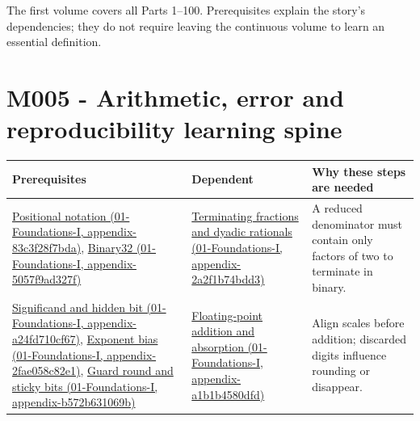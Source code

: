 The first volume covers all Parts 1--100. Prerequisites explain the story's dependencies; they do not require leaving the continuous volume to learn an essential definition.

\section{M005 - Arithmetic, error and reproducibility learning spine}\label{appendix-4ad47bdd269a-m005---arithmetic-error-and-reproducibility-learning-spine}

{\def\LTcaptype{none} %
\begin{longtable}[]{@{}
  >{\raggedright\arraybackslash}p{}
  >{\raggedright\arraybackslash}p{}
  >{\raggedright\arraybackslash}p{}@{}}
\toprule\noalign{}
\begin{minipage}[b]{\linewidth}\raggedright
Prerequisites
\end{minipage} & \begin{minipage}[b]{\linewidth}\raggedright
Dependent
\end{minipage} & \begin{minipage}[b]{\linewidth}\raggedright
Why these steps are needed
\end{minipage} \\
\midrule\noalign{}
\endhead
\bottomrule\noalign{}
\endlastfoot
\href{../01-Foundations-I/main.pdf\#nameddest=appendix-83c3f28f7bda}{Positional notation (01-Foundations-I, appendix-83c3f28f7bda)}, \href{../01-Foundations-I/main.pdf\#nameddest=appendix-5057f9ad327f}{Binary32 (01-Foundations-I, appendix-5057f9ad327f)} & \href{../01-Foundations-I/main.pdf\#nameddest=appendix-2a2f1b74bdd3}{Terminating fractions and dyadic rationals (01-Foundations-I, appendix-2a2f1b74bdd3)} & A reduced denominator must contain only factors of two to terminate in binary. \\
\href{../01-Foundations-I/main.pdf\#nameddest=appendix-a24fd710cf67}{Significand and hidden bit (01-Foundations-I, appendix-a24fd710cf67)}, \href{../01-Foundations-I/main.pdf\#nameddest=appendix-2fae058c82e1}{Exponent bias (01-Foundations-I, appendix-2fae058c82e1)}, \href{../01-Foundations-I/main.pdf\#nameddest=appendix-b572b631069b}{Guard round and sticky bits (01-Foundations-I, appendix-b572b631069b)} & \href{../01-Foundations-I/main.pdf\#nameddest=appendix-a1b1b4580dfd}{Floating-point addition and absorption (01-Foundations-I, appendix-a1b1b4580dfd)} & Align scales before addition; discarded digits influence rounding or disappear. \\

\end{longtable}}
